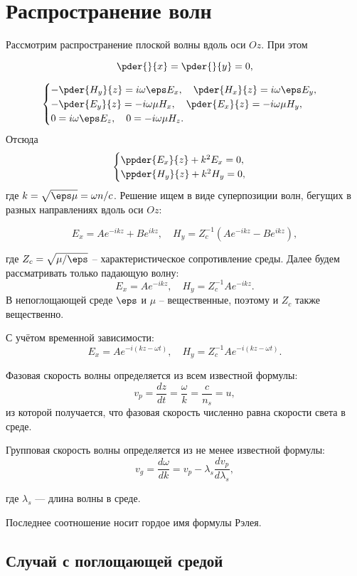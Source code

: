 \chapter{Распространение волн}
Рассмотрим распространение плоской волны вдоль оси \(Oz\). При этом

\[
    \pder{}{x} = \pder{}{y} = 0,
\]

\[
    \begin{cases}
        -\pder{H_y}{z} = i\omega\eps E_x,\quad \pder{H_x}{z} = i\omega\eps E_y,\\
        -\pder{E_y}{z} = -i\omega\mu H_x,\quad \pder{E_x}{z} = -i\omega\mu H_y,\\
        0 = i\omega\eps E_z,\quad 0 = -i\omega\mu H_z.
    \end{cases}
\]
Отсюда
\[
    \begin{cases}
        \ppder{E_x}{z} + k^2 E_x = 0,\\
        \ppder{H_y}{z} + k^2 H_y = 0,\\
    \end{cases}
\]
где \( k = \sqrt{\eps\mu} = \omega n / c \).
Решение ищем в виде суперпозиции волн, бегущих в разных направлениях вдоль оси
\( Oz \):

\[
    E_x = Ae^{-ikz} + Be^{ikz},\quad H_y = Z_c^{-1} (Ae^{-ikz} - Be^{ikz}),
\]

где \( Z_c = \sqrt{\mu / \eps} \) -- характеристическое сопротивление среды.
Далее будем рассматривать только падающую волну:
\[
    E_x = Ae^{-ikz},\quad H_y = Z_c^{-1} Ae^{-ikz}.
\]
В непоглощающей среде \(\eps\) и \(\mu\) -- вещественные, поэтому и \(Z_c\)
также вещественно.

С учётом временной зависимости:
\[
    E_x = Ae^{-i(kz-\omega t)},\quad H_y = Z_c^{-1} Ae^{-i(kz-\omega t)}.
\]

Фазовая скорость волны определяется из всем известной формулы:
\[
v_p=\frac{dz}{dt}=\frac{\omega}{k}=\frac{c}{n_s}=u,
\]
из которой получается, что фазовая скорость численно равна скорости света в среде.

Групповая скорость волны определяется из не менее известной формулы:
\[
v_g=\frac{d\omega}{dk}=v_p - \lambda_s\frac{dv_p}{d\lambda_s},
\]

где $\lambda_s$ --- длина волны в среде.


Последнее соотношение носит гордое имя формулы Рэлея.

\section{Случай с поглощающей средой}

